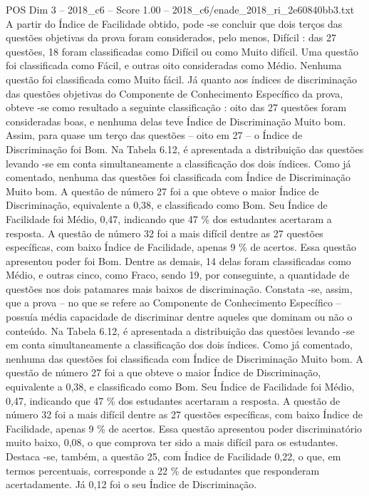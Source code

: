 \begin{textsample}{POS Dim 3 – 2018\_c6 – Score 1.00 – 2018\_c6/enade\_2018\_ri\_2e60840bb3.txt}
A partir do Índice de Facilidade obtido, pode -se concluir que dois terços das questões objetivas da prova foram considerados, pelo menos, Difícil : das 27 questões, 18 foram classificadas como Difícil ou como Muito difícil.
Uma questão foi classificada como Fácil, e outras oito consideradas como Médio.
Nenhuma questão foi classificada como Muito fácil.
Já quanto aos índices de discriminação das questões objetivas do Componente de Conhecimento Específico da prova, obteve -se como resultado a seguinte classificação : oito das 27 questões foram consideradas boas, e nenhuma delas teve Índice de Discriminação Muito bom.
Assim, para quase um terço das questões – oito em 27 – o Índice de Discriminação foi Bom.
Na Tabela 6.12, é apresentada a distribuição das questões levando -se em conta simultaneamente a classificação dos dois índices.
Como já comentado, nenhuma das questões foi classificada com Índice de Discriminação Muito bom.
A questão de número 27 foi a que obteve o maior Índice de Discriminação, equivalente a 0,38, e classificado como Bom.
Seu Índice de Facilidade foi Médio, 0,47, indicando que 47 \% dos estudantes acertaram a resposta.
A questão de número 32 foi a mais difícil dentre as 27 questões específicas, com baixo Índice de Facilidade, apenas 9 \% de acertos.
Essa questão apresentou poder foi Bom.
Dentre as demais, 14 delas foram classificadas como Médio, e outras cinco, como Fraco, sendo 19, por conseguinte, a quantidade de questões nos dois patamares mais baixos de discriminação.
Constata -se, assim, que a prova – no que se refere ao Componente de Conhecimento Específico – possuía média capacidade de discriminar dentre aqueles que dominam ou não o conteúdo.
Na Tabela 6.12, é apresentada a distribuição das questões levando -se em conta simultaneamente a classificação dos dois índices.
Como já comentado, nenhuma das questões foi classificada com Índice de Discriminação Muito bom.
A questão de número 27 foi a que obteve o maior Índice de Discriminação, equivalente a 0,38, e classificado como Bom.
Seu Índice de Facilidade foi Médio, 0,47, indicando que 47 \% dos estudantes acertaram a resposta.
A questão de número 32 foi a mais difícil dentre as 27 questões específicas, com baixo Índice de Facilidade, apenas 9 \% de acertos.
Essa questão apresentou poder discriminatório muito baixo, 0,08, o que comprova ter sido a mais difícil para os estudantes.
Destaca -se, também, a questão 25, com Índice de Facilidade 0,22, o que, em termos percentuais, corresponde a 22 \% de estudantes que responderam acertadamente.
Já 0,12 foi o seu Índice de Discriminação.

\end{textsample}
